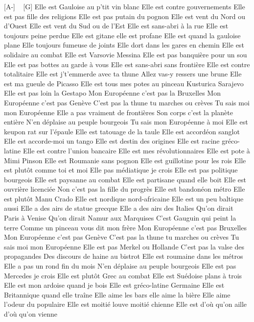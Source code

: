 [A-] ~ [G]
Elle est Gauloise au p'tit vin blanc
Elle est contre gouvernements
Elle est pas fille des religions
Elle est pas putain du pognon
Elle est vent du Nord ou d'Ouest
Elle est vent du Sud ou de l'Est
Elle est sans-abri à la rue
Elle est toujours peine perdue
Elle est gitane elle est profane
Elle est quand la gauloise plane
Elle toujours fumeuse de joints
Elle dort dans les gares en chemin
Elle est solidaire au combat
Elle est Varsovie Messina
Elle est pas banquière pour un sou
Elle est pas bottes au garde à vous
Elle est sans-abri sans frontière
Elle est contre totalitaire
Elle est j't'emmerde avec ta thune
Allez vas-y ressers une brune
Elle est ma gueule de Picasso
Elle est tous mes potes au pinceau
Kusturica Sarajevo
Elle est pas loin la Gestapo
Mon Européenne c'est pas la Bruxelles
Mon Européenne c'est pas Genève
C'est pas la thune tu marches ou crèves
Tu sais moi mon Européenne
Elle a pas vraiment de frontières
Son corps c'est la planète entière
N'en déplaise au peuple bourgeois
Tu sais mon Européenne à moi
Elle est keupon rat sur l'épaule
Elle est tatouage de la taule
Elle est accordéon sanglot
Elle est accorde-moi un tango
Elle est destin des origines
Elle est racine gréco-latine
Elle est contre l'union bancaire
Elle est mes révolutionnaires
Elle est pote à Mimi Pinson
Elle est Roumanie sans pognon
Elle est guillotine pour les rois
Elle est plutôt comme toi et moi
Elle pas médiatique je crois
Elle est pas politique bourgeois
Elle est paysanne au combat
Elle est partisane quand elle boit
Elle est ouvrière licenciée
Non c'est pas la fille du progrès
Elle est bandonéon métro
Elle est plutôt Manu Crado
Elle est nordique nord-africaine
Elle est un peu baltique aussi
Elle a des airs de statue grecque
Elle a des airs des Italies
Qu'on dirait Paris à Venise
Qu'on dirait Namur aux Marquises
C'est Gauguin qui peint la terre
Comme un pinceau vous dit mon frère
Mon Européenne c'est pas Bruxelles
Mon Européenne c'est pas Genève
C'est pas la thune tu marches ou crèves
Tu sais moi mon Européenne
Elle est pas Merkel ou Hollande
C'est pas la valse des propagandes
Des discours de haine au bistrot
Elle est roumaine dans les métros
Elle a pas un rond fin du mois
N'en déplaise au peuple bourgeois
Elle est pas Mercedes je crois
Elle est plutôt Grec au combat
Elle est Suédoise plans à trois
Elle est mon ardoise quand je bois
Elle est gréco-latine Germaine
Elle est Britannique quand elle traîne
Elle aime les bars elle aime la bière
Elle aime l'odeur du populaire
Elle est moitié louve moitié chienne
Elle est d'où qu'on aille d'où qu'on vienne
